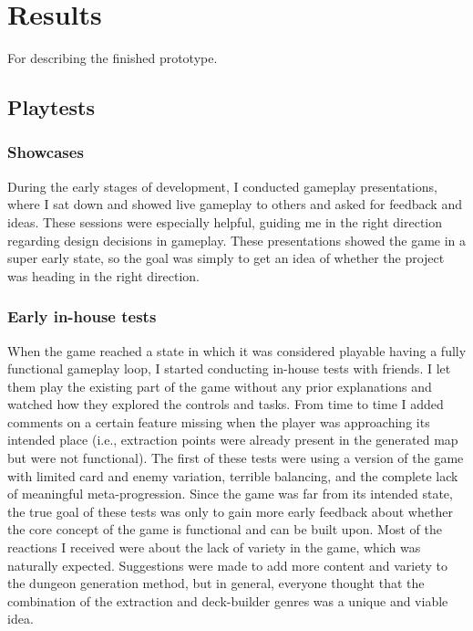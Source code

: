 \chapter{Results} \label{Chapter:Results}

For describing the finished prototype.

\section{Playtests}

\subsection{Showcases}

During the early stages of development, I conducted gameplay presentations, where I sat down and showed live gameplay to others and asked for feedback and ideas. These sessions were especially helpful, guiding me in the right direction regarding design decisions in gameplay. These presentations showed the game in a super early state, so the goal was simply to get an idea of whether the project was heading in the right direction.

\subsection{Early in-house tests}

When the game reached a state in which it was considered playable having a fully functional gameplay loop, I started conducting in-house tests with friends. I let them play the existing part of the game without any prior explanations and watched how they explored the controls and tasks. From time to time I added comments on a certain feature missing when the player was approaching its intended place (i.e., extraction points were already present in the generated map but were not functional). The first of these tests were using a version of the game with limited card and enemy variation, terrible balancing, and the complete lack of meaningful meta-progression. Since the game was far from its intended state, the true goal of these tests was only to gain more early feedback about whether the core concept of the game is functional and can be built upon. Most of the reactions I received were about the lack of variety in the game, which was naturally expected. Suggestions were made to add more content and variety to the dungeon generation method, but in general, everyone thought that the combination of the extraction and deck-builder genres was a unique and viable idea.

